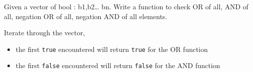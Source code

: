 \documentclass[answers]{exam}
\newcommand*{\ANCOASTAT}{}%
\begin{document}
\begin{questions}
\question Given a vector of bool : b1,b2… bn. Write a function to check OR of all, AND of all, negation OR of all, negation AND of all elements.
\begin{solution}[.2in]
Iterate through the vector, 
\begin{itemize}
	\item the first \lstinline{true} encountered will return \lstinline{true} for the OR function
	\item the first \lstinline{false} encountered will return \lstinline{false} for the AND function
\end{itemize}
\end{solution}


\end{questions}
\fi
\ifdefined\ANCOASTAT
\newpage
\end{document}
